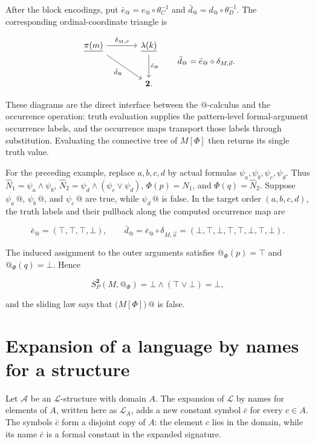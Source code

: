 \documentclass[11pt]{article}
\makeatletter
\newcommand{\atsign}{\mathord{@}}
\newcommand{\finord}[1]{\underline{#1}}
\makeatother
\begin{document}
After the block encodings, put
\(\bar e_{\atsign}=e_{\atsign}\circ\theta_C^{-1}\) and
\(\bar d_{\atsign}=d_{\atsign}\circ\theta_D^{-1}\). The corresponding
ordinal-coordinate triangle is

\[
\begin{tikzcd}[row sep=large,column sep=large]
\finord{\pi(m)} \arrow[r,"\delta_{M,\vec o}"]
  \arrow[dr,"\bar d_{\atsign}"'] &
\finord{\lambda(k)} \arrow[d,"\bar e_{\atsign}"] \\
& \mathbf 2.
\end{tikzcd}
\qquad
\bar d_{\atsign}=\bar e_{\atsign}\circ\delta_{M,\vec o}.
\]

These diagrams are the direct interface between the \(\atsign\)-calculus and
the occurrence operation: truth evaluation supplies the pattern-level
formal-argument occurrence labels, and the
occurrence maps transport those labels through substitution. Evaluating the
connective tree of \(M[\Phi]\) then returns its single truth value.

For the preceding example, replace \(a,b,c,d\) by actual formulas
\(\psi_a,\psi_b,\psi_c,\psi_d\). Thus
\(\widehat N_1=\psi_a\wedge\psi_b\),
\(\widehat N_2=\psi_d\wedge(\psi_c\vee\psi_d)\),
\(\Phi(p)=\widehat N_1\), and \(\Phi(q)=\widehat N_2\). Suppose
\(\psi_a\,\atsign\), \(\psi_b\,\atsign\), and
\(\psi_c\,\atsign\) are true, while \(\psi_d\,\atsign\) is false. In the
target order \((a,b,c,d)\), the truth labels and their pullback along the
computed occurrence map are

\[
\bar e_{\atsign}=(\top,\top,\top,\bot),
\qquad
\bar d_{\atsign}
=\bar e_{\atsign}\circ\delta_{M,\vec o}
=(\bot,\top,\bot,\top,\top,\bot,\top,\bot).
\]

The induced assignment to the outer arguments satisfies
\(\atsign_\Phi(p)=\top\) and \(\atsign_\Phi(q)=\bot\). Hence

\[
S_P^{\mathbf 2}(M,\atsign_\Phi)
=\bot\wedge(\top\vee\bot)=\bot,
\]

and the sliding law says that \(\bigl(M[\Phi]\bigr)\,\atsign\) is false.


\section{Expansion of a language by names for a
structure}\label{expansion-of-a-language-by-names-for-a-structure}

Let \(\mathcal A\) be an \(\mathcal L\)-structure with domain \(A\). The
expansion of \(\mathcal L\) by names for elements of \(A\), written here
as \(\mathcal L_A\), adds a new constant symbol \(\bar c\) for every
\(c\in A\). The symbols \(\bar c\) form a disjoint copy of \(A\): the
element \(c\) lies in the domain, while its name \(\bar c\) is a formal
constant in the expanded signature.
\end{document}
